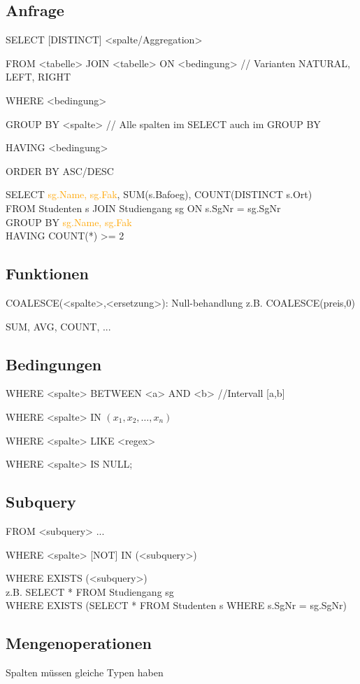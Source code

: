 \subsection{Anfrage}
SELECT [DISTINCT] <spalte/Aggregation>      

FROM <tabelle> JOIN <tabelle> ON <bedingung> // Varianten NATURAL, LEFT, RIGHT

WHERE <bedingung>

GROUP BY <spalte>   // Alle spalten im SELECT auch im GROUP BY

HAVING <bedingung>

ORDER BY ASC/DESC




SELECT \textcolor{orange}{sg.Name, sg.Fak}, SUM(s.Bafoeg), COUNT(DISTINCT s.Ort)\\
FROM Studenten s JOIN Studiengang sg ON s.SgNr = sg.SgNr\\
GROUP BY \textcolor{orange}{sg.Name, sg.Fak}\\
HAVING COUNT(*) >= 2






\subsection{Funktionen}
COALESCE(<spalte>,<ersetzung>): Null-behandlung z.B. COALESCE(preis,0)

SUM, AVG, COUNT, ...
\subsection{Bedingungen}
WHERE <spalte> BETWEEN <a> AND <b>    //Intervall [a,b]

WHERE <spalte> IN $(x_1, x_2,\dots , x_n)$

WHERE <spalte> LIKE <regex>

WHERE <spalte> IS NULL;

\subsection{Subquery}
FROM <subquery> 
...

WHERE <spalte> [NOT] IN (<subquery>)

WHERE EXISTS (<subquery>)\\

z.B. SELECT * FROM Studiengang sg\\
WHERE EXISTS (SELECT * FROM Studenten s WHERE s.SgNr = sg.SgNr)


\subsection{Mengenoperationen}
Spalten müssen gleiche Typen haben
 

